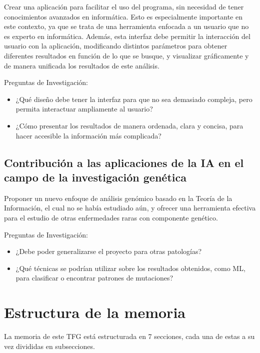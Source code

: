 \documentclass[11pt,spanish,listoffigures,listoftables]{tfgetsinf}
\begin{document}
Crear una aplicación para facilitar el uso del programa, sin necesidad de tener conocimientos avanzados en informática. Esto es especialmente importante en este contexto, ya que se trata de una herramienta enfocada a un usuario que no es experto en informática. Además, esta interfaz debe permitir la interacción del usuario con la aplicación, modificando distintos parámetros para obtener diferentes resultados en función de lo que se busque, y visualizar gráficamente y de manera unificada los resultados de este análisis. 

Preguntas de Investigación: 
\begin{itemize}
\item ¿Qué diseño debe tener la interfaz para que no sea demasiado compleja, pero permita interactuar ampliamente al usuario? 
\item ¿Cómo presentar los resultados de manera ordenada, clara y concisa, para hacer accesible la información más complicada? 
\end{itemize}

\subsection{Contribución a las aplicaciones de la \acs{IA} en el campo de la investigación genética }

Proponer un nuevo enfoque de análisis genómico basado en la Teoría de la Información, el cual no se había estudiado aún, y ofrecer una herramienta efectiva para el estudio de otras enfermedades raras con componente genético. 

Preguntas de Investigación: 
\begin{itemize}
\item ¿Debe poder generalizarse el proyecto para otras patologías? 
\item ¿Qué técnicas se podrían utilizar sobre los resultados obtenidos, como \acs{ML}, para clasificar o encontrar patrones de mutaciones? 
\end{itemize}


\section{Estructura de la memoria}

La memoria de este \acs{TFG} está estructurada en 7 secciones, cada una de estas a su vez divididas en subsecciones.  
\end{document}

